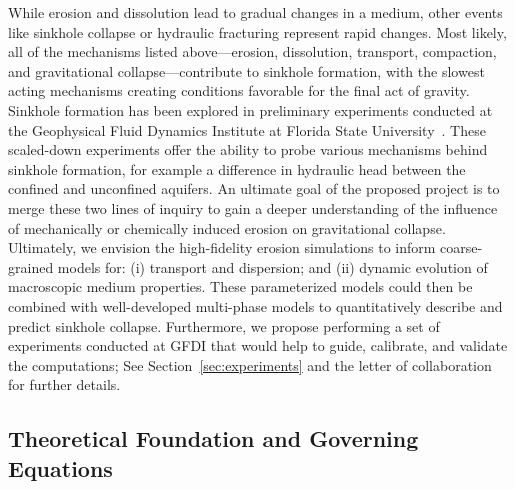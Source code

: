 \documentclass[11pt]{article}
\begin{document}
While erosion and dissolution lead to gradual changes in a medium, other events like sinkhole collapse or hydraulic fracturing represent rapid changes.  Most likely, all of the mechanisms listed above---erosion, dissolution, transport, compaction, and gravitational collapse---contribute to sinkhole formation, with the slowest acting mechanisms creating conditions favorable for the final act of gravity.  Sinkhole formation has been explored in preliminary experiments conducted at the Geophysical Fluid Dynamics Institute at Florida State University~\cite{tao2014experimental}. These scaled-down experiments offer the ability to probe various mechanisms behind sinkhole formation, for example a difference in hydraulic head between the confined and unconfined aquifers. An ultimate goal of the proposed project is to merge these two lines of inquiry to gain a deeper understanding of the influence of mechanically or chemically induced erosion on gravitational collapse.  Ultimately, we envision the high-fidelity erosion simulations to inform coarse-grained models for: (i) transport and dispersion; and (ii) dynamic evolution of macroscopic medium properties. These parameterized models could then be combined with well-developed multi-phase models \cite{breward2003multiphase, cogan2010multiphase, Imma2019, eastham2019multiphase} to quantitatively describe and predict sinkhole collapse. Furthermore, we propose performing a set of experiments conducted at GFDI that would help to guide, calibrate, and validate the computations; See Section~\ref{sec:experiments} and the letter of collaboration for further details.

\subsection{Theoretical Foundation and Governing Equations}
\end{document}
